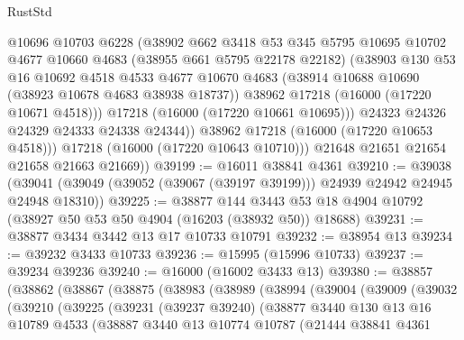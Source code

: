 \begin{lexlean}{RustStd}
\begin{coremodule}
                @10696
                @10703
                @6228
                (@38902
                  @662
                  @3418
                  @53
                  @345
                  @5795
                  @10695
                  @10702
                  @4677
                  @10660
                  @4683
                  (@38955 @661 @5795 @22178 @22182)
                  (@38903
                    @130
                    @53
                    @16
                    @10692
                    @4518
                    @4533
                    @4677
                    @10670
                    @4683
                    (@38914 @10688 @10690 (@38923 @10678 @4683 @38938 @18737))
                    @38962
                    @17218
                    (@16000 (@17220 @10671 @4518)))
                  @17218
                  (@16000 (@17220 @10661 @10695)))
                @24323
                @24326
                @24329
                @24333
                @24338
                @24344))
            @38962
            @17218
            (@16000 (@17220 @10653 @4518)))
          @17218
          (@16000 (@17220 @10643 @10710)))
        @21648
        @21651
        @21654
        @21658
        @21663
        @21669))
@39199 := @16011 @38841 @4361
@39210 := @39038
    (@39041 (@39049 (@39052 (@39067 (@39197 @39199))) @24939 @24942 @24945 @24948 @18310))
@39225 := @38877
    @144
    @3443
    @53
    @18
    @4904
    @10792
    (@38927 @50 @53 @50 @4904 (@16203 (@38932 @50)) @18688)
@39231 := @38877 @3434 @3442 @13 @17 @10733 @10791
@39232 := @38954 @13
@39234 := @39232 @3433 @10733
@39236 := @15995 (@15996 @10733)
@39237 := @39234 @39236
@39240 := @16000 (@16002 @3433 @13)
@39380 := @38857
    (@38862
      (@38867
        (@38875
          (@38983
            (@38989
              (@38994
                (@39004
                  (@39009
                    (@39032
                      (@39210
                        (@39225
                          (@39231
                            (@39237 @39240)
                            (@38877
                              @3440
                              @130
                              @13
                              @16
                              @10789
                              @4533
                              (@38887
                                @3440
                                @13
                                @10774
                                @10787
                                (@21444
                                  @38841
                                  @4361

\end{coremodule}
\end{lexlean}
